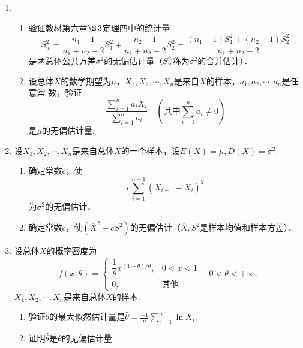 \documentclass[10pt,a4paper]{article}
\begin{document}
\begin{enumerate}
    \item \begin{enumerate}
        \item 验证教材第六章$\S\, 3$定理四中的统计量
        $$S_w^2=\frac{n_1-1}{n_1+n_2-2}S_1^2+\frac{n_2-1}{n_1+n_2-2}S_2^2=\frac{(n_1-1)S_1^2+(n_2-1)S_2^2}{n_1+n_2-2}$$
        是两总体公共方差$\sigma^2$的无偏估计量（$S_w^2$称为$\sigma^2$的合并估计）．
        \item 设总体$X$的数学期望为$\mu$，$X_1,X_2,\cdots,X_n$是来自$X$的样本，$a_1,a_2,\cdots,a_n$是任意常
        数，验证
        $$\frac{\displaystyle{\sum_{i=1}^n a_i X_i}}{\displaystyle{\sum _{i=1}^n a_i}}\quad(\mbox{其中}\sum_{i=1}^n a_i \neq 0)$$
        是$\mu$的无偏估计量.
    \end{enumerate}



    \item 设$X_1,X_2,\cdots,X_n$是来自总体$X$的一个样本，设$E(X)=\mu,D(X)=\sigma^2$.
    \begin{enumerate}
        \item 确定常数$c$，使$$c\sum_{i=1}^{n-1}(X_{i+1}-X_i)^2$$为$\sigma^2$的无偏估计．
        \item 确定常数$c$，使$(\overline{X}^2-cS^2)$的无偏估计（$\overline{X},S^2$是样本均值和样本方差）．
    \end{enumerate}



    \item 设总体$X$的概率密度为
    \renewcommand{\arraystretch}{1.3}
    $$f(x;\theta)=\left\{\begin{array}{ll}
        \dfrac{1}{\theta}x^{(1-\theta)/\theta}, & 0<x<1\\
        0, & \mbox{其他}
    \end{array}\right.\quad 0<\theta<+\infty,$$
    \renewcommand{\arraystretch}{1.0}
    $X_1,X_2,\cdots,X_n$是来自总体$X$的样本.
    \begin{enumerate}
        \item 验证$\theta$的最大似然估计量是$\displaystyle{\hat{\theta}=\frac{-1}{n}\sum_{i=1}^n \ln X_i}$.
        \item 证明$\hat{\theta}$是$\theta$的无偏估计量.
    \end{enumerate}



\end{enumerate}
\end{document}
